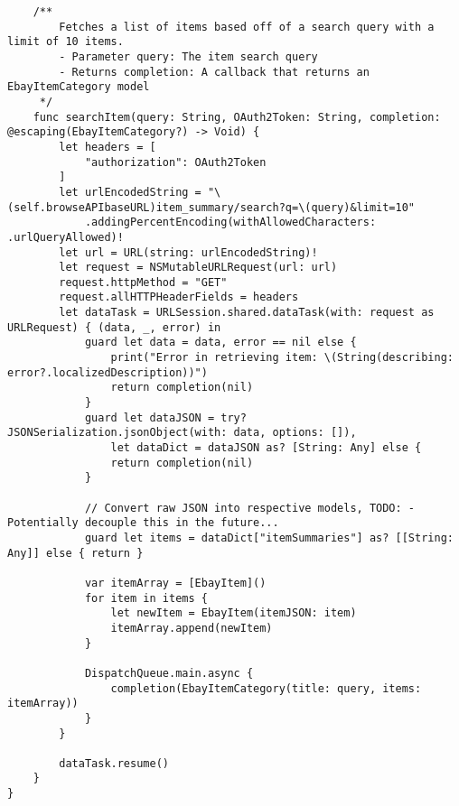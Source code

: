 \begin{verbatim}
    /**
        Fetches a list of items based off of a search query with a limit of 10 items.
        - Parameter query: The item search query
        - Returns completion: A callback that returns an EbayItemCategory model
     */
    func searchItem(query: String, OAuth2Token: String, completion: @escaping(EbayItemCategory?) -> Void) {
        let headers = [
            "authorization": OAuth2Token
        ]
        let urlEncodedString = "\(self.browseAPIbaseURL)item_summary/search?q=\(query)&limit=10"
            .addingPercentEncoding(withAllowedCharacters: .urlQueryAllowed)!
        let url = URL(string: urlEncodedString)!
        let request = NSMutableURLRequest(url: url)
        request.httpMethod = "GET"
        request.allHTTPHeaderFields = headers
        let dataTask = URLSession.shared.dataTask(with: request as URLRequest) { (data, _, error) in
            guard let data = data, error == nil else {
                print("Error in retrieving item: \(String(describing: error?.localizedDescription))")
                return completion(nil)
            }
            guard let dataJSON = try? JSONSerialization.jsonObject(with: data, options: []),
                let dataDict = dataJSON as? [String: Any] else {
                return completion(nil)
            }

            // Convert raw JSON into respective models, TODO: - Potentially decouple this in the future...
            guard let items = dataDict["itemSummaries"] as? [[String: Any]] else { return }

            var itemArray = [EbayItem]()
            for item in items {
                let newItem = EbayItem(itemJSON: item)
                itemArray.append(newItem)
            }

            DispatchQueue.main.async {
                completion(EbayItemCategory(title: query, items: itemArray))
            }
        }

        dataTask.resume()
    }
}
\end{verbatim}

